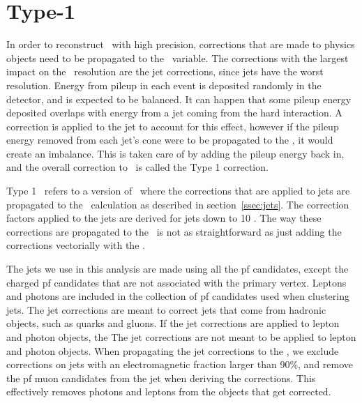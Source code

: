 
\section{Type-1 \texorpdfstring{\MET}{MET}}
\label{sec:t1met}
In order to reconstruct \MET\ with high precision, corrections that are made to physics objects need to be propagated to the \MET\ variable.
The corrections with the largest impact on the \MET\ resolution are the jet corrections, since jets have the worst resolution.
Energy from pileup in each event is deposited randomly in the detector, and is expected to be balanced.
It can happen that some pileup energy deposited overlaps with energy from a jet coming from the hard interaction.
A correction is applied to the jet to account for this effect,
however if the pileup energy removed from each jet's cone were to be propagated to the \MET, it would create an imbalance.
This is taken care of by adding the pileup energy back in, and the overall correction to \MET\ is called the Type 1 correction.

Type 1 \MET\ refers to a version of \MET\ where the corrections that are applied to jets are propagated to the \MET\ calculation as described in section~\ref{ssec:jets}.
The correction factors applied to the jets are derived for jets down to 10 \gev.
The way these corrections are propagated to the \MET\ is not as straightforward as just adding the corrections vectorially with the \MET.

The jets we use in this analysis are made using all the pf candidates, except the charged pf candidates that are not associated with the primary vertex.
Leptons and photons are included in the collection of pf candidates used when clustering jets.
The jet corrections are meant to correct jets that come from hadronic objects, such as quarks and gluons.
If the jet corrections are applied to lepton and photon objects, the
The jet corrections are not meant to be applied to lepton and photon objects.
When propagating the jet corrections to the \MET, we exclude corrections on jets with an electromagnetic fraction larger than 90\%,
and remove the pf muon candidates from the jet when deriving the corrections.
This effectively removes photons and leptons from the objects that get corrected.

